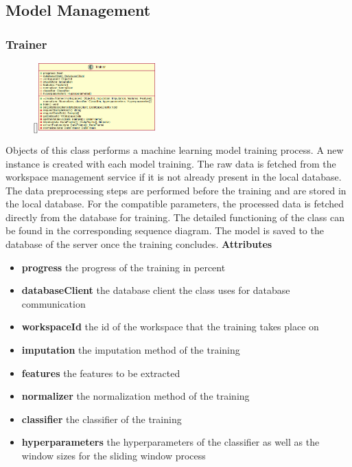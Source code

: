 \subsection{Model Management}

\subsubsection{Trainer}
\label{Trainer}
\begin{figure}
    \raisebox{0pt}[\dimexpr{}\baselineskip\relax]{\includegraphics[width=4.5cm]{classes/model-management/1.png}}
\end{figure} 
\par
Objects of this class performs a machine learning model training process. A new instance is created with each model training. The raw data is fetched from the workspace management service if it is not already present in the local database. The data preprocessing steps are performed before the training and are stored in the local database. For the compatible parameters, the processed data is fetched directly from the database for training. The detailed functioning of the class can be found in the corresponding sequence diagram. The model is saved to the database of the server once the training concludes.
\newline
\newline
\textbf{Attributes}
\begin{itemize}
    \item \textbf{progress} the progress of the training in percent
    \item \textbf{databaseClient} the database client the class uses for database communication
    \item \textbf{workspaceId} the id of the workspace that the training takes place on
    \item \textbf{imputation} the imputation method of the training
    \item \textbf{features} the features to be extracted
    \item \textbf{normalizer} the normalization method of the training
    \item \textbf{classifier} the classifier of the training
    \item \textbf{hyperparameters} the hyperparameters of the classifier as well as the window sizes for the sliding window process
\end{itemize}
